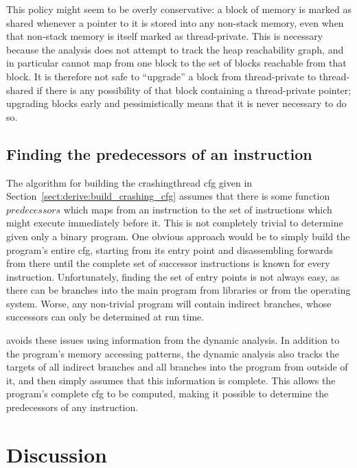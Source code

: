 This policy might seem to be overly conservative: a block of memory is
marked as shared whenever a pointer to it is stored into any non-stack
memory, even when that non-stack memory is itself marked as
thread-private.  This is necessary because the analysis does not
attempt to track the heap reachability graph, and in particular cannot
map from one block to the set of blocks reachable from that block.  It
is therefore not safe to ``upgrade'' a block from thread-private to
thread-shared if there is any possibility of that block containing a
thread-private pointer; upgrading blocks early and pessimistically
means that it is never necessary to do so.


\subsection{Finding the predecessors of an instruction}
\label{sect:program_model:instr_predecessors}


The algorithm for building the \gls{crashingthread} \gls{cfg} given in
Section~\ref{sect:derive:build_crashing_cfg} assumes that there is
some function $\mathit{predecessors}$ which maps from an instruction
to the set of instructions which might execute immediately before it.
This is not completely trivial to determine given only a binary
program.  One obvious approach would be to simply build the program's
entire \gls{cfg}, starting from its entry point and disassembling
forwards from there until the complete set of successor instructions
is known for every instruction.  Unfortunately, finding the set of
entry points is not always easy, as there can be branches into the
main program from libraries or from the operating system.  Worse, any
non-trivial program will contain indirect branches, whose successors
can only be determined at run time.

{\Implementation} avoids these issues using information from the
dynamic analysis.  In addition to the program's memory accessing
patterns, the dynamic analysis also tracks the targets of all indirect
branches and all branches into the program from outside of it, and
then simply assumes that this information is complete.  This allows
the program's complete \gls{cfg} to be computed, making it possible to
determine the predecessors of any instruction.

\section{Discussion}
